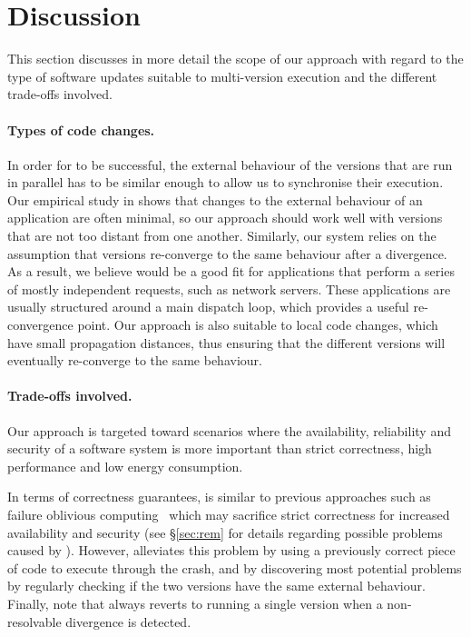 \section{Discussion}
\label{sec:discussion}

This section discusses in more detail the scope of our approach with
regard to the type of software updates suitable to multi-version
execution and the different trade-offs involved.


\paragraph{Types of code changes.} In order for \mx to be successful, the
external behaviour of the versions that are run in parallel has to be similar
enough to allow us to synchronise their execution.  Our empirical study in
 shows that changes to the external behaviour of
an application are often minimal, so our approach should work well with
versions that are not too distant from one another.  Similarly, our system
relies on the assumption that versions re-converge to the same behaviour after
a divergence.  As a result, we believe \mx would be a good fit for applications
that perform a series of mostly independent requests, such as network servers.
These applications are usually structured around a main dispatch loop, which
provides a useful re-convergence point.  Our approach is also suitable to local
code changes, which have small propagation distances, thus ensuring that the
different versions will eventually re-converge to the same behaviour.

\paragraph{Trade-offs involved.} Our approach is targeted toward scenarios
where the availability, reliability and security of a software system is more
important than strict correctness, high performance and low energy consumption.  

In terms of correctness guarantees, \mx is similar to previous approaches such
as failure oblivious computing~\cite{fo} which may sacrifice strict correctness
for increased availability and security (see \S\ref{sec:rem} for details
regarding possible problems caused by \mx).  However, \mx alleviates this
problem by using a previously correct piece of code to execute through the
crash, and by discovering most potential problems by regularly checking if the
two versions have the same external behaviour.  Finally, note that \mx always
reverts to running a single version when a non-resolvable divergence is
detected.

